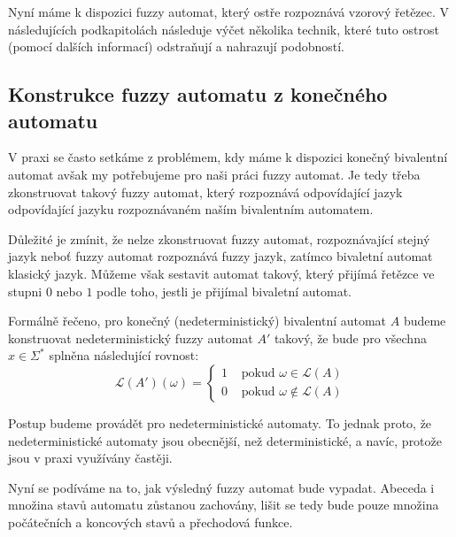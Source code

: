 \documentclass[a4paper,10pt]{article}
\begin{document}
Nyní máme k dispozici fuzzy automat, který ostře rozpoznává vzorový řetězec. V následujících podkapitolách následuje výčet několika technik, které tuto ostrost (pomocí dalších informací) odstraňují a nahrazují podobností.


\subsection{Konstrukce fuzzy automatu z konečného automatu}
V praxi se často setkáme z problémem, kdy máme k dispozici konečný bivalentní automat avšak my potřebujeme pro naši práci fuzzy automat. Je tedy třeba zkonstruovat takový fuzzy automat, který rozpoznává odpovídající jazyk odpovídající jazyku rozpoznávaném naším bivalentním automatem. 

Důležité je zmínit, že nelze zkonstruovat fuzzy automat, rozpoznávající stejný jazyk neboť fuzzy automat rozpoznává fuzzy jazyk, zatímco bivaletní automat klasický  jazyk. Můžeme však sestavit automat takový, který přijímá řetězce ve stupni $0$ nebo $1$ podle toho, jestli je přijímal bivaletní automat.

Formálně řečeno, pro konečný (nedeterministický) bivalentní automat $A$ budeme konstruovat nedeterministický fuzzy automat $A'$ takový, že bude pro všechna $x \in \Sigma^*$ splněna následující rovnost:
$$
 \mathcal{L}(A')(\omega) = 
  \begin{cases}
   1 & \text{ pokud } \omega \in \mathcal{L}(A) \\
   0 & \text{ pokud } \omega \notin \mathcal{L}(A)
  \end{cases}
$$

\begin{note}
 Postup budeme provádět pro nedeterministické automaty. To jednak proto, že nedeterministické automaty jsou obecnější, než deterministické, a navíc, protože jsou v praxi využívány častěji. 
\end{note}

Nyní se podíváme na to, jak výsledný fuzzy automat bude vypadat. Abeceda i množina stavů automatu zůstanou zachovány, lišit se tedy bude pouze množina počátečních a koncových stavů a přechodová funkce. 
\end{document}
